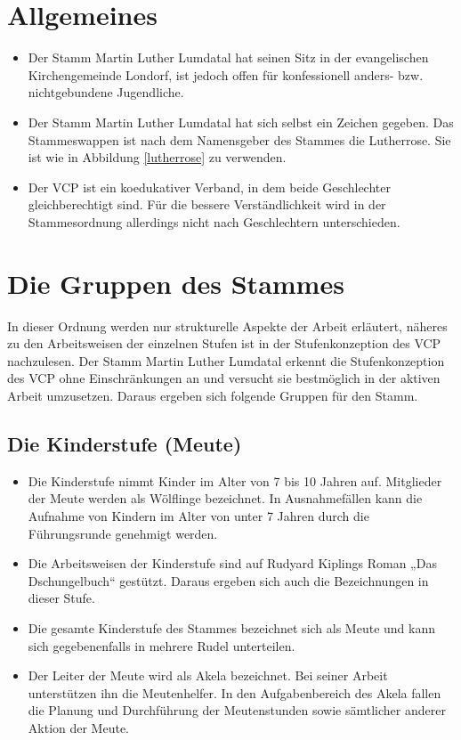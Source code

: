 \documentclass[a4paper]{article}
\begin{document}
\section{Allgemeines} %
\label{sec:allgemeines}
    \begin{itemize}
        \item Der Stamm Martin Luther Lumdatal hat seinen Sitz in der evangelischen Kirchengemeinde Londorf, ist jedoch offen für konfessionell anders- bzw. nichtgebundene Jugendliche.
        \item Der Stamm Martin Luther Lumdatal hat sich selbst ein Zeichen gegeben. Das Stammeswappen ist nach dem Namensgeber des Stammes die Lutherrose. Sie ist wie in Abbildung \ref{lutherrose} zu verwenden.
        \item Der VCP ist ein koedukativer Verband, in dem beide Geschlechter gleichberechtigt sind. Für die bessere Verständlichkeit wird in der Stammesordnung allerdings nicht nach Geschlechtern unterschieden.
    \end{itemize}

\section{Die Gruppen des Stammes} %
\label{sec:die_gruppen_des_stammes}
In dieser Ordnung werden nur strukturelle Aspekte der Arbeit erläutert, näheres zu den Arbeitsweisen der einzelnen Stufen ist in der Stufenkonzeption des VCP nachzulesen. Der Stamm Martin Luther Lumdatal erkennt die Stufenkonzeption des VCP ohne Einschränkungen an und versucht sie bestmöglich in der aktiven Arbeit umzusetzen. Daraus ergeben sich folgende Gruppen für den Stamm.
    \subsection{Die Kinderstufe (Meute)} %
    \label{sub:die_kinderstufe_meute}
		\begin{itemize}
			\item Die Kinderstufe nimmt Kinder im Alter von 7 bis 10 Jahren auf. Mitglieder der Meute werden als Wölflinge bezeichnet. In Ausnahmefällen kann die Aufnahme von Kindern im Alter von unter 7 Jahren durch die Führungsrunde genehmigt werden. 
			\item Die Arbeitsweisen der Kinderstufe sind auf Rudyard Kiplings Roman „Das Dschungelbuch“ gestützt. Daraus ergeben sich auch die Bezeichnungen in dieser Stufe. 
			\item Die gesamte Kinderstufe des Stammes bezeichnet sich als Meute und kann sich gegebenenfalls in mehrere Rudel unterteilen. 
			\item Der Leiter der Meute wird als Akela bezeichnet. Bei seiner Arbeit unterstützen ihn die Meutenhelfer. In den Aufgabenbereich des Akela fallen die Planung und Durchführung der Meutenstunden sowie sämtlicher anderer Aktion der Meute. 
		\end{itemize}
    
\end{document}
